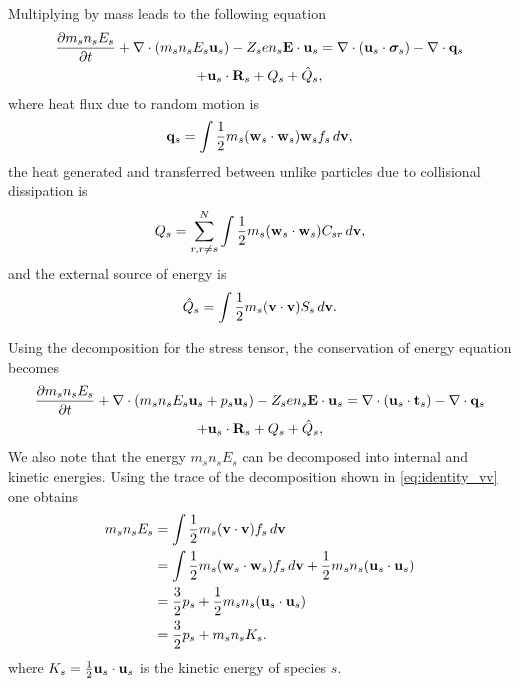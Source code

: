 \documentclass[a4paper,11pt]{report}
\begin{document}
Multiplying by mass leads to the following equation
\begin{multline}
\label{eq:energy_derv_5}
\frac{\partial m_s n_s E_s}{\partial t} + \nabla \cdot (m_s n_s E_s \mathbf{u}_s ) - Z_s e n_s \mathbf{E} \cdot \mathbf{u}_s = \nabla \cdot ( \mathbf{u}_s \cdot \boldsymbol{\sigma}_s ) - \nabla \cdot \mathbf{q}_s \\
+ \mathbf{u}_s \cdot \mathbf{R}_s + Q_{s} + \hat{Q}_s, 
\end{multline}
where heat flux due to random motion is
\begin{equation}
\mathbf{q}_s = \int \frac{1}{2} m_s (\mathbf{w}_s \cdot \mathbf{w}_s ) \mathbf{w}_s f_s \, d\mathbf{v},
\end{equation}
the heat generated and transferred between unlike particles due to collisional dissipation is 
\begin{equation}
Q_{s} = \sum_{r,r \ne s}^N \int \frac{1}{2} m_s (\mathbf{w}_s \cdot \mathbf{w}_s) C_{s r} \, d\mathbf{v},
\end{equation}
and the external source of energy is
\begin{equation}
\hat{Q}_s = \int \frac{1}{2} m_s (\mathbf{v} \cdot \mathbf{v}) S_s \, d\mathbf{v}.
\end{equation}

Using the decomposition for the stress tensor, the conservation of energy equation becomes
\begin{multline}
\label{eq:energy_derv_6}
\frac{\partial m_s n_s E_s}{\partial t} + \nabla \cdot (m_s n_s E_s \mathbf{u}_s + p_s \mathbf{u}_s ) - Z_s e n_s \mathbf{E} \cdot \mathbf{u}_s = \nabla \cdot ( \mathbf{u}_s \cdot \mathbf{t}_s ) - \nabla \cdot \mathbf{q}_s \\
+ \mathbf{u}_s \cdot \mathbf{R}_s + Q_{s} + \hat{Q}_s, 
\end{multline}
We also note that the energy $m_s n_s E_s$ can be decomposed into internal and kinetic energies. Using the trace of the decomposition shown in \cref{eq:identity_vv} one obtains
\begin{align}
m_s n_s E_s & = \int \frac{1}{2} m_s (\mathbf{v} \cdot \mathbf{v}) f_s \, d\mathbf{v} \nonumber \\
& = \int \frac{1}{2} m_s (\mathbf{w}_s \cdot \mathbf{w}_s) f_s \, d\mathbf{v} + \frac{1}{2} m_s n_s (\mathbf{u}_s \cdot \mathbf{u}_s) \nonumber \\
& = \frac{3}{2} p_s + \frac{1}{2} m_s n_s (\mathbf{u}_s \cdot \mathbf{u}_s) \nonumber \\
& = \frac{3}{2} p_s + m_s n_s K_s.
\end{align}
where $K_s = \frac{1}{2} \mathbf{u}_s \cdot \mathbf{u}_s$ is the kinetic energy of species $s$.
\end{document}
